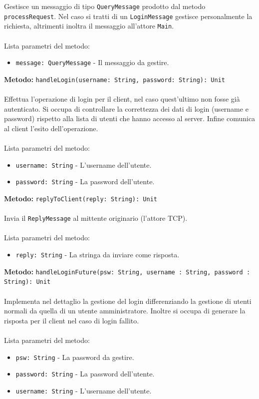 \documentclass[a4paper]{article}
\begin{document}
			Gestisce un messaggio di tipo \texttt{QueryMessage} prodotto dal metodo \texttt{processRequest}. Nel caso si tratti di un \texttt{LoginMessage} gestisce personalmente la richiesta, altrimenti inoltra il messaggio all'attore \texttt{Main}.
			\\ \\
			Lista parametri del metodo:
			\begin{itemize}
				\item \texttt{message: QueryMessage} - Il messaggio da gestire.
			\end{itemize}
		\textbf{Metodo: }\texttt{handleLogin(username: String, password: String): Unit}
			\\ \\
			Effettua l'operazione di login per il client, nel caso quest'ultimo non fosse già autenticato. Si occupa di controllare la correttezza dei dati di login (username e password) rispetto alla lista di utenti che hanno accesso al server. Infine comunica al client l'esito dell'operazione.
			\\ \\
			Lista parametri del metodo:
			\begin{itemize}
				\item \texttt{username: String} - L'username dell'utente.
				\item \texttt{password: String} - La password dell'utente.
			\end{itemize}
		\textbf{Metodo: }\texttt{replyToClient(reply: String): Unit}
			\\ \\
			Invia il \texttt{ReplyMessage} al mittente originario (l'attore TCP).
			\\ \\
			Lista parametri del metodo:
			\begin{itemize}
				\item \texttt{reply: String} - La stringa da inviare come risposta.
			\end{itemize}
		\textbf{Metodo: }\texttt{handleLoginFuture(psw: String, username : String, password : String): Unit}
			\\ \\
			Implementa nel dettaglio la gestione del login differenziando la gestione di utenti normali da quella di un utente amministratore. Inoltre si occupa di generare la risposta per il client nel caso di login fallito.
			\\ \\
			Lista parametri del metodo:
			\begin{itemize}
				\item \texttt{psw: String} - La password da gestire.
				\item \texttt{password: String} - La password dell'utente.
				\item \texttt{username: String} - L'username dell'utente.
			\end{itemize}
			
\end{document}
